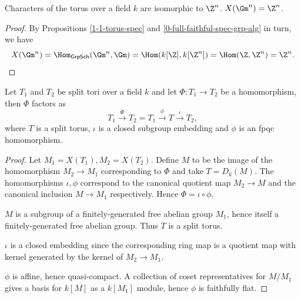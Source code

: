 \begin{proposition}
  \label{1-1-char-torus}

  Characters of the torus over a field $k$ are isomorphic to $\Z^n$. $X(\Gm^n) = \Z^n$.
\end{proposition}
\begin{proof}

  By Propositions \ref{1-1-torus-spec} and \ref{0-full-faithful-spec-grp-alg} in turn, we have
  \[
    X(\Gm^n) = \Hom_{\mathsf{GrpSch}}(\Gm^n, \Gm) = \Hom(k[\Z], k[\Z^n]) = \Hom(\Z, \Z^n) = \Z^n.
  \]
\end{proof}


\begin{proposition}
  \label{1-1-1-group-hom-subtorus} %

  Let $T_1$ and $T_2$ be split tori over a field $k$ and let $\Phi: T_1 \to T_2$ be a homomorphism,
  then $\Phi$ factors as
  \[
    T_1 \xrightarrow{\Phi} T_2 = T_1 \xrightarrow{\phi} T \xrightarrow{\iota} T_2,
  \]
  where $T$ is a split torus, $\iota$ is a closed subgroup embedding and $\phi$ is an fpqc homomorphism.
\end{proposition}
\begin{proof}
  Let $M_1=X(T_1), M_2=X(T_2)$. Define $M$ to be the image of the homomorphism $M_2 \to M_1$
  corresponding to $\Phi$ and take $T = D_k(M)$. The homomorphisms $\iota,\phi$ correspond to the
  canonical quotient map $M_2 \to M$ and the canonical inclusion $M \to M_1$ respectively.
  Hence $\Phi = \iota\circ\phi$.

  $M$ is a subgroup of a finitely-generated free abelian group $M_1$,
  hence itself a finitely-generated free abelian group. Thus $T$ is a split torus.

  $\iota$ is a closed embedding since the corresponding ring map is a quotient map with kernel
  generated by the kernel of $M_2 \to M_1$.

  $\phi$ is affine, hence quasi-compact. A collection of coset representatives for $M /M_1$
  gives a basis for $k[M]$ as a $k[M_1]$ module, hence $\phi$ is faithfully flat.
\end{proof}


